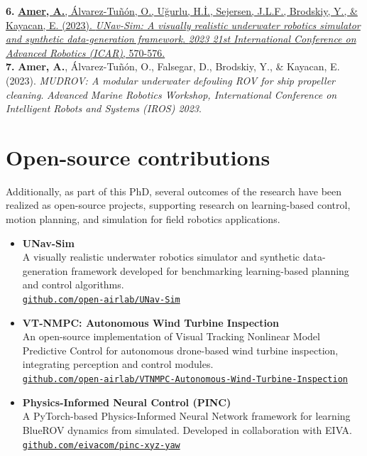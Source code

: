 \textbf{6.} \href{https://ieeexplore.ieee.org/abstract/document/10406819}{\textbf{Amer, A.}, Álvarez-Tuñón, O., Uğurlu, H.İ., Sejersen, J.L.F., Brodskiy, Y., \& Kayacan, E. (2023). \textit{UNav-Sim: A visually realistic underwater robotics simulator and synthetic data-generation framework}. \textit{2023 21st International Conference on Advanced Robotics (ICAR)}, 570-576.}\\[0.8em]

\textbf{7.} \textbf{Amer, A.}, Álvarez-Tuñón, O., Falsegar, D., Brodskiy, Y., \& Kayacan, E. (2023). \textit{MUDROV: A modular underwater defouling ROV for ship propeller cleaning}. \textit{Advanced Marine Robotics Workshop, International Conference on Intelligent Robots and Systems (IROS) 2023}.



\section*{Open-source contributions}

Additionally, as part of this PhD, several outcomes of the research have been realized as open-source projects, supporting research on learning-based control, motion planning, and simulation for field robotics applications.



\begin{itemize}
    \item \textbf{UNav-Sim} \\
    A visually realistic underwater robotics simulator and synthetic data-generation framework developed for benchmarking learning-based planning and control algorithms.\\
    \href{https://github.com/open-airlab/UNav-Sim}{\texttt{github.com/open-airlab/UNav-Sim}}

    \item \textbf{VT-NMPC: Autonomous Wind Turbine Inspection} \\
    An open-source implementation of Visual Tracking Nonlinear Model Predictive Control for autonomous drone-based wind turbine inspection, integrating perception and control modules.\\
    \href{https://github.com/open-airlab/VTNMPC-Autonomous-Wind-Turbine-Inspection}{\texttt{github.com/open-airlab/VTNMPC-Autonomous-Wind-Turbine-Inspection}}

    \item \textbf{Physics-Informed Neural Control (PINC)} \\
    A PyTorch-based Physics-Informed Neural Network framework for learning BlueROV dynamics from simulated. Developed in collaboration with EIVA.\\
    \href{https://github.com/eivacom/pinc-xyz-yaw}{\texttt{github.com/eivacom/pinc-xyz-yaw}}
\end{itemize}





